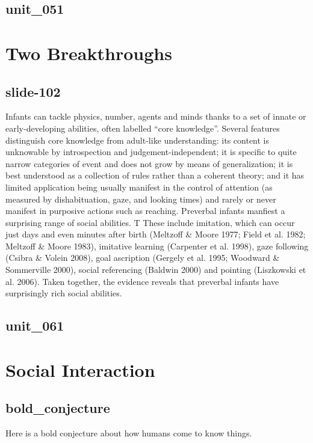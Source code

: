 \documentclass[12pt,\papersize]{extarticle}
\begin{document}
 
\subsection{unit\_051}
 
\section{Two Breakthroughs}
 
 
\subsection{slide-102}
Infants can tackle physics, number, agents and minds thanks to a set of innate or early-developing abilities, often labelled “core knowledge”.
Several features distinguish core knowledge from adult-like understanding: its content is unknowable by introspection and judgement-independent; it is specific to quite narrow categories of event and does not grow by means of generalization; it is best understood as a collection of rules rather than a coherent theory; and it has limited application being usually manifest in the control of attention (as measured by dishabituation, gaze, and looking times) and rarely or never manifest in purposive actions such as reaching.
Preverbal infants manfiest a surprising range of social abilities. T
These include imitation, which can occur just days and even minutes after birth (Meltzoff \& Moore 1977; Field et al. 1982; Meltzoff \& Moore 1983), imitative learning (Carpenter et al. 1998), gaze following (Csibra \& Volein 2008), goal ascription (Gergely et al. 1995; Woodward \& Sommerville 2000), social referencing (Baldwin 2000) and pointing (Liszkowski et al. 2006).
Taken together, the evidence reveals that preverbal infants have surprisingly rich social abilities.
 
 
\subsection{unit\_061}
 
\section{Social Interaction}
 
 
\subsection{bold\_conjecture}
Here is a bold conjecture about how humans come to know things.
 
\end{document}
